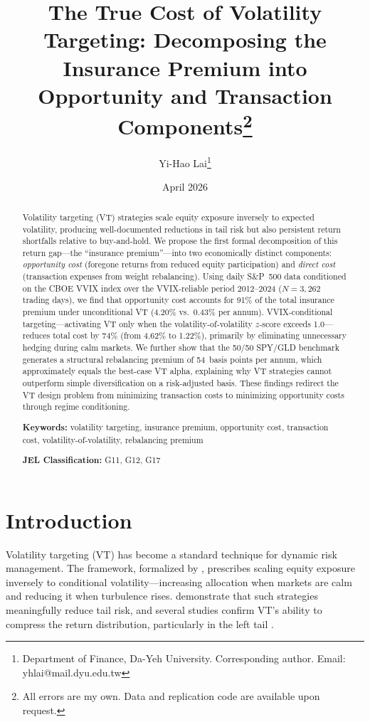 \documentclass[12pt,a4paper]{article}
\title{The True Cost of Volatility Targeting: Decomposing the Insurance Premium into Opportunity and Transaction Components\thanks{All errors are my own. Data and replication code are available upon request.}}
\author{Yi-Hao Lai\thanks{Department of Finance, Da-Yeh University. Corresponding author. Email: yhlai@mail.dyu.edu.tw}}
\date{April 2026}
\begin{document}
\maketitle

\begin{abstract}
\noindent
Volatility targeting (VT) strategies scale equity exposure inversely to expected volatility, producing well-documented reductions in tail risk but also persistent return shortfalls relative to buy-and-hold. We propose the first formal decomposition of this return gap---the ``insurance premium''---into two economically distinct components: \emph{opportunity cost} (foregone returns from reduced equity participation) and \emph{direct cost} (transaction expenses from weight rebalancing). Using daily S\&P~500 data conditioned on the CBOE VVIX index over the VVIX-reliable period 2012--2024 ($N=3{,}262$ trading days), we find that opportunity cost accounts for 91\% of the total insurance premium under unconditional VT (4.20\% vs.\ 0.43\% per annum). VVIX-conditional targeting---activating VT only when the volatility-of-volatility $z$-score exceeds 1.0---reduces total cost by 74\% (from 4.62\% to 1.22\%), primarily by eliminating unnecessary hedging during calm markets. We further show that the 50/50 SPY/GLD benchmark generates a structural rebalancing premium of 54~basis points per annum, which approximately equals the best-case VT alpha, explaining why VT strategies cannot outperform simple diversification on a risk-adjusted basis. These findings redirect the VT design problem from minimizing transaction costs to minimizing opportunity costs through regime conditioning.

\medskip
\noindent
\textbf{Keywords:} volatility targeting, insurance premium, opportunity cost, transaction cost, volatility-of-volatility, rebalancing premium

\medskip
\noindent
\textbf{JEL Classification:} G11, G12, G17
\end{abstract}

\newpage

\section{Introduction}
\label{sec:intro}

Volatility targeting (VT) has become a standard technique for dynamic risk management. The framework, formalized by \citet{moreira2017}, prescribes scaling equity exposure inversely to conditional volatility---increasing allocation when markets are calm and reducing it when turbulence rises. \citet{harvey2018} demonstrate that such strategies meaningfully reduce tail risk, and several studies confirm VT's ability to compress the return distribution, particularly in the left tail \citep{fleming2001, hocquard2013}.
\end{document}

